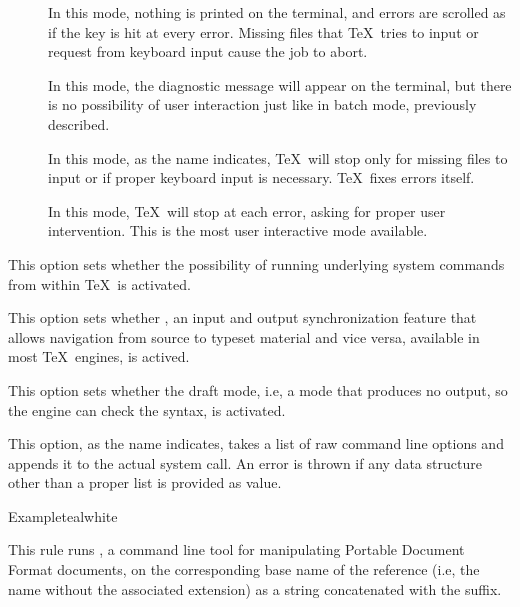 \begin{description}
\begin{description}
\begin{description}
\item[] In this mode, nothing is printed on the terminal, and errors are scrolled as if the  key is hit at every error. Missing files that \TeX\ tries to input or request from keyboard input cause the job to abort.

\item[] In this mode, the diagnostic message will appear on the terminal, but there is no possibility of user interaction just like in batch mode, previously described.

\item[] In this mode, as the name indicates, \TeX\ will stop only for missing files to input or if proper keyboard input is necessary. \TeX\ fixes errors itself.

\item[] In this mode, \TeX\ will stop at each error, asking for proper user intervention. This is the most user interactive mode available.
\end{description}

\item[\rpsbox{shell}] This option sets whether the possibility of running underlying system commands from within \TeX\ is activated.

\item[\rpsbox{synctex}] This option sets whether , an input and output synchronization feature that allows navigation from source to typeset material and vice versa, available in most \TeX\ engines, is actived.

\item[\rpsbox{draft}] This option sets whether the draft mode, i.e, a mode that produces no output, so the engine can check the syntax, is activated.

\item[\abox{options}] This option, as the name indicates, takes a list of raw command line options and appends it to the actual system call. An error is thrown if any data structure other than a proper list is provided as value.
\end{description}

\begin{codebox}{Example}{teal}{\icnote}{white}
\end{codebox}

\item[\rulebox{pdftk}{Nicola Talbot, Paulo Cereda}] This rule runs , a command line tool for manipulating Portable Document Format documents, on the corresponding base name of the  reference (i.e, the name without the associated extension) as a string concatenated with the  suffix.


\end{description}
